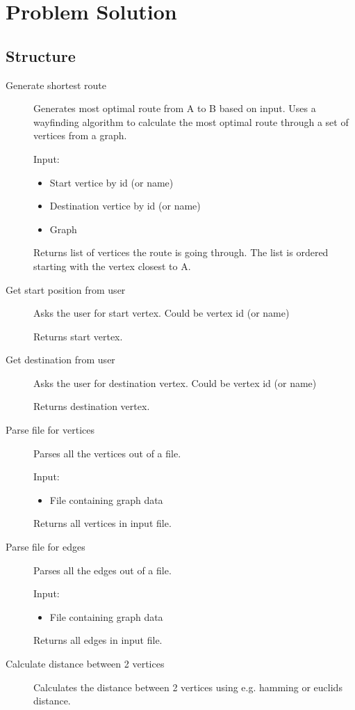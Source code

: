 \chapter{Problem Solution}

\section{Structure} %
\label{sec:structure}

\begin{description}
	\item[Generate shortest route] 
	Generates most optimal route from A to B based on input. Uses a wayfinding algorithm to calculate the most optimal route through a set of vertices from a graph.

	Input:
	\begin{itemize}
		\item Start vertice by id (or name)
		\item Destination vertice by id (or name)
		\item Graph
	\end{itemize}
	Returns list of vertices the route is going through. The list is ordered starting with the vertex closest to A.
	\item[Get start position from user] 
	Asks the user for start vertex. Could be vertex id (or name)

	Returns start vertex.
	\item[Get destination from user] 
	Asks the user for destination vertex. Could be vertex id (or name)

	Returns destination vertex.
	\item[Parse file for vertices] 
	Parses all the vertices out of a file.

	Input:
	\begin{itemize}
		\item File containing graph data
	\end{itemize}
	Returns all vertices in input file.
	\item[Parse file for edges] 
	Parses all the edges out of a file.

	Input:
	\begin{itemize}
		\item File containing graph data
	\end{itemize}
	Returns all edges in input file.
	\item[Calculate distance between 2 vertices] 
	Calculates the distance between 2 vertices using e.g. hamming or euclids distance.


\end{description}
